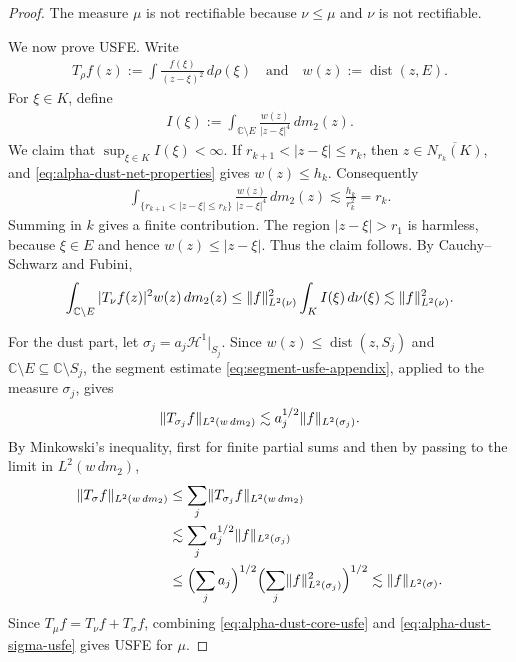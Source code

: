 \documentclass[11pt,a4paper,english,reqno]{amsart}
\newcommand{\hd}[1]{\mathcal{H}^{#1}}
\numberwithin{equation}{section}
\newcommand{\CC}[0]{\mathbb{C}}
\renewcommand{\subset}{\subseteq}
\DeclareMathOperator{\dist}{dist}
\DeclarePairedDelimiter{\paren}{(}{)}
\DeclarePairedDelimiter{\norm}{\lVert}{\rVert}
\renewcommand{\restriction}{\big|}
\numberwithin{definition}{section}
\begin{document}
\begin{proof}
  The measure $\mu$ is not rectifiable because $\nu\le\mu$ and $\nu$ is not rectifiable.

  We now prove USFE.  Write
  \begin{align}
    T_\rho f(z):=\int \frac{f(\xi)}{(z-\xi)^2}\,d\rho(\xi)
    \quad\text{and}\quad
    w(z):=\dist(z,E).
  \end{align}
  For $\xi\in K$, define
  \begin{align}
    I(\xi):=\int_{\CC\setminus E}\frac{w(z)}{|z-\xi|^4}\,dm_2(z) .
  \end{align}
  We claim that $\sup_{\xi\in K}I(\xi)<\infty$.  If $r_{k+1}<|z-\xi|\le r_k$, then $z\in\overline{N_{r_k}(K)}$, and \cref{eq:alpha-dust-net-properties} gives $w(z)\le h_k$.  Consequently
  \begin{align}
    \int_{\{r_{k+1}<|z-\xi|\le r_k\}}
    \frac{w(z)}{|z-\xi|^4}\,dm_2(z)
    \lesssim \frac{h_k}{r_k^2}=r_k .
  \end{align}
  Summing in $k$ gives a finite contribution.  The region $|z-\xi|>r_1$ is harmless, because $\xi\in E$ and hence $w(z)\le |z-\xi|$.  Thus the claim follows.  By Cauchy--Schwarz and Fubini,
  \begin{align}\label{eq:alpha-dust-core-usfe}
    \int_{\CC\setminus E}|T_\nu f(z)|^2w(z)\,dm_2(z)
    \le \norm{f}_{L^2(\nu)}^2\int_K I(\xi)\,d\nu(\xi)
    \lesssim \norm{f}_{L^2(\nu)}^2 .
  \end{align}

  For the dust part, let $\sigma_j=a_j\hd1\restriction_{S_j}$.  Since $w(z)\le\dist(z,S_j)$ and $\CC\setminus E\subset\CC\setminus S_j$, the segment estimate \cref{eq:segment-usfe-appendix}, applied to the measure $\sigma_j$, gives
  \begin{align}
    \norm{T_{\sigma_j} f}_{L^2(w\,dm_2)}
    \lesssim a_j^{1/2}\norm{f}_{L^2(\sigma_j)} .
  \end{align}
  By Minkowski's inequality, first for finite partial sums and then by passing to the limit in $L^2(w\,dm_2)$,
  \begin{align}\label{eq:alpha-dust-sigma-usfe}
    \norm{T_\sigma f}_{L^2(w\,dm_2)}
    &\le \sum_j \norm{T_{\sigma_j} f}_{L^2(w\,dm_2)} \\
    &\lesssim \sum_j a_j^{1/2}\norm{f}_{L^2(\sigma_j)} \\
    &\le \paren[\Big]{ \sum_j a_j }^{1/2}
      \paren[\Big]{ \sum_j \norm{f}_{L^2(\sigma_j)}^2 }^{1/2}
    \lesssim \norm{f}_{L^2(\sigma)} .
  \end{align}
  Since $T_\mu f=T_\nu f+T_\sigma f$, combining \cref{eq:alpha-dust-core-usfe} and \cref{eq:alpha-dust-sigma-usfe} gives USFE for $\mu$.


\end{proof}
\end{document}
